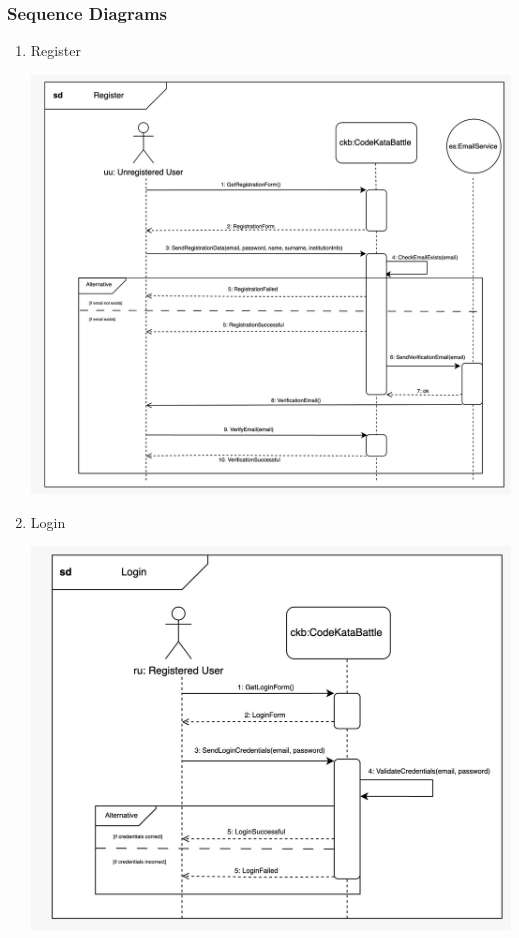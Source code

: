 \subsubsection{Sequence Diagrams}
\begin{enumerate}
    \item Register
    \begin{center}
            \includegraphics[scale=0.2]{Images/sequence_diagrams/SD-register.jpeg}
    \end{center}
    \item Login
    \begin{center}
            \includegraphics[scale=0.2]{Images/sequence_diagrams/SD-login.jpeg}

\end{center}
\end{enumerate}
